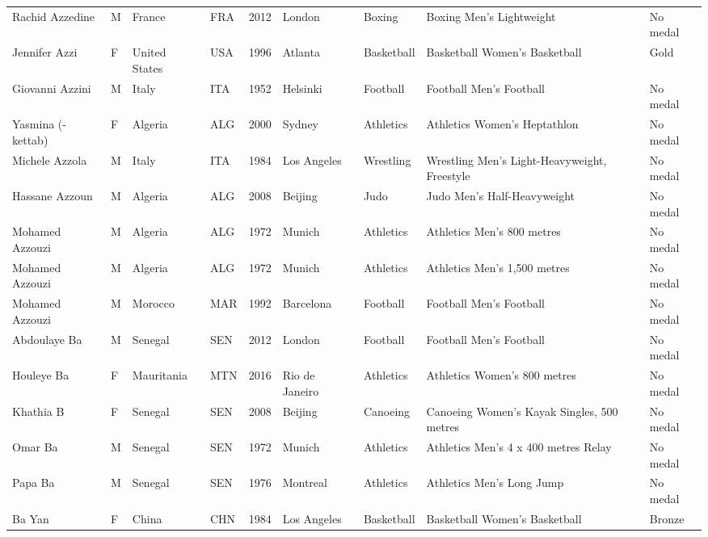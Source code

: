 \documentclass{article}%
\begin{document}
\begin{longtable}{l l l l l l l l l}
Rachid Azzedine&M&France&FRA&2012&London&Boxing&Boxing Men's Lightweight&No medal\\%
Jennifer Azzi&F&United States&USA&1996&Atlanta&Basketball&Basketball Women's Basketball&Gold\\%
Giovanni Azzini&M&Italy&ITA&1952&Helsinki&Football&Football Men's Football&No medal\\%
Yasmina ({-}kettab)&F&Algeria&ALG&2000&Sydney&Athletics&Athletics Women's Heptathlon&No medal\\%
Michele Azzola&M&Italy&ITA&1984&Los Angeles&Wrestling&Wrestling Men's Light{-}Heavyweight, Freestyle&No medal\\%
Hassane Azzoun&M&Algeria&ALG&2008&Beijing&Judo&Judo Men's Half{-}Heavyweight&No medal\\%
Mohamed Azzouzi&M&Algeria&ALG&1972&Munich&Athletics&Athletics Men's 800 metres&No medal\\%
Mohamed Azzouzi&M&Algeria&ALG&1972&Munich&Athletics&Athletics Men's 1,500 metres&No medal\\%
Mohamed Azzouzi&M&Morocco&MAR&1992&Barcelona&Football&Football Men's Football&No medal\\%
Abdoulaye Ba&M&Senegal&SEN&2012&London&Football&Football Men's Football&No medal\\%
Houleye Ba&F&Mauritania&MTN&2016&Rio de Janeiro&Athletics&Athletics Women's 800 metres&No medal\\%
Khathia B&F&Senegal&SEN&2008&Beijing&Canoeing&Canoeing Women's Kayak Singles, 500 metres&No medal\\%
Omar Ba&M&Senegal&SEN&1972&Munich&Athletics&Athletics Men's 4 x 400 metres Relay&No medal\\%
Papa Ba&M&Senegal&SEN&1976&Montreal&Athletics&Athletics Men's Long Jump&No medal\\%
Ba Yan&F&China&CHN&1984&Los Angeles&Basketball&Basketball Women's Basketball&Bronze\\%
\end{longtable}%
\end{document}
